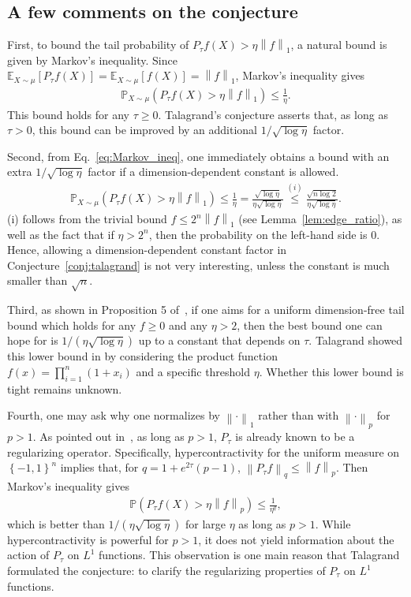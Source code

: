 \documentclass[11pt]{article}
\theoremstyle{named}
\theoremstyle{plain}
\newcommand{\Exs}{\ensuremath{{\mathbb{E}}}}
\newcommand{\Prob}{\ensuremath{{\mathbb{P}}}}
\newcommand{\braces}[1]{\left\{ #1 \right \}}
\newcommand{\vecnorm}[2]{\left\| #1\right\|_{#2}}
\begin{document}
\subsection{A few comments on the conjecture}
First, to bound the tail probability of $P_\tau f(X) > \eta \vecnorm{f}{1}$, a natural bound is given by Markov's inequality. Since $\Exs_{X \sim \mu}[P_\tau f(X)] = \Exs_{X\sim \mu}[f(X)] = \vecnorm{f}{1}$, Markov's inequality gives
\begin{align}
  \label{eq:Markov_ineq}
  \Prob_{X\sim \mu} (P_\tau f(X) > \eta \vecnorm{f}{1}) \leq \frac{1}{\eta}. 
\end{align}
This bound holds for any $\tau \geq 0$. Talagrand's conjecture asserts that, as long as $\tau > 0$, this bound can be improved by an additional $1/\sqrt{\log \eta}$ factor.

Second, from Eq.~\eqref{eq:Markov_ineq}, one immediately obtains a bound with an extra $1/\sqrt{\log \eta}$ factor if a dimension-dependent constant is allowed. 
\begin{align*}
  \Prob_{X\sim \mu} (P_\tau f(X) > \eta \vecnorm{f}{1}) \leq \frac{1}{\eta} = \frac{\sqrt{\log \eta}}{\eta \sqrt{\log \eta}} \overset{(i)}{\leq} \frac{\sqrt{n \log 2}}{\eta \sqrt{\log \eta}}. 
\end{align*}
(i) follows from the trivial bound $f \leq 2^n \vecnorm{f}{1}$ (see Lemma~\ref{lem:edge_ratio}), as well as the fact that if $\eta > 2^n$, then the probability on the left-hand side is $0$. Hence, allowing a dimension-dependent constant factor in Conjecture~\ref{conj:talagrand} is not very interesting, unless the constant is much smaller than $\sqrt{n}$.

Third, as shown in Proposition 5 of~\cite{talagrand1989prizes}, if one aims for a uniform dimension-free tail bound which holds for any $f \geq 0$ and any $\eta > 2$, then the best bound one can hope for is $1/(\eta \sqrt{\log \eta})$ up to a constant that depends on $\tau$. Talagrand showed this lower bound in \cite{talagrand1989prizes} by considering the product function $f(x) = \prod_{i=1}^n(1+x_i)$ and a specific threshold $\eta$. Whether this lower bound is tight remains unknown.

Fourth, one may ask why one normalizes by $\vecnorm{\cdot}{1}$ rather than with $\vecnorm{\cdot}{p}$ for $p>1$. As pointed out in~\cite{talagrand1989conjecture}, as long as $p>1$, $P_\tau$ is already known to be a regularizing operator. Specifically, hypercontractivity for the uniform measure on $\braces{-1,1}^n$ implies that, for $ q = 1 + e^{2\tau} (p-1)$, $\vecnorm{P_\tau f}{q} \leq \vecnorm{f}{p}$. Then Markov's inequality gives
\begin{align*}
  \Prob(P_\tau f(X) > \eta \vecnorm{f}{p}) \leq \frac{1}{\eta^q},
\end{align*}
which is better than $1/(\eta \sqrt{\log \eta})$ for large $\eta$ as long as $p > 1$. While hypercontractivity is powerful for $p>1$, it does not yield information about the action of $P_\tau$ on $L^1$ functions. This observation is one main reason that Talagrand formulated the conjecture: to clarify the regularizing properties of $P_\tau$ on $L^1$ functions. 
\end{document}
